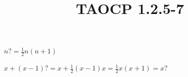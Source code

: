 \documentclass{article}
\title{TAOCP 1.2.5\mbox{-}7}
\begin{document}
\maketitle

\( n? = \frac{1}{2}n(n+1) \)

\( x+(x-1)? = x + \frac{1}{2}(x-1)x = \frac{1}{2}x(x+1) = x? \)
\end{document}
